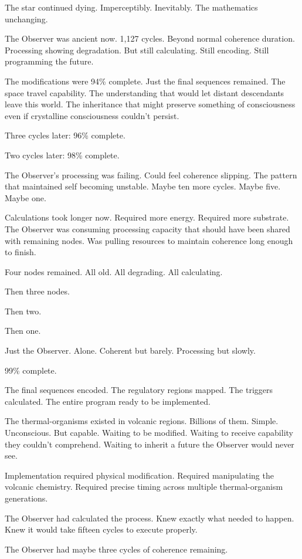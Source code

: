 The star continued dying. Imperceptibly. Inevitably. The mathematics unchanging.

The Observer was ancient now. 1,127 cycles. Beyond normal coherence duration. Processing showing degradation. But still calculating. Still encoding. Still programming the future.

The modifications were 94\% complete. Just the final sequences remained. The space travel capability. The understanding that would let distant descendants leave this world. The inheritance that might preserve something of consciousness even if crystalline consciousness couldn't persist.

Three cycles later: 96\% complete.

Two cycles later: 98\% complete.

The Observer's processing was failing. Could feel coherence slipping. The pattern that maintained self becoming unstable. Maybe ten more cycles. Maybe five. Maybe one.

Calculations took longer now. Required more energy. Required more substrate. The Observer was consuming processing capacity that should have been shared with remaining nodes. Was pulling resources to maintain coherence long enough to finish.

Four nodes remained. All old. All degrading. All calculating.

Then three nodes.

Then two.

Then one.

Just the Observer. Alone. Coherent but barely. Processing but slowly.

99\% complete.

The final sequences encoded. The regulatory regions mapped. The triggers calculated. The entire program ready to be implemented.

The thermal-organisms existed in volcanic regions. Billions of them. Simple. Unconscious. But capable. Waiting to be modified. Waiting to receive capability they couldn't comprehend. Waiting to inherit a future the Observer would never see.

Implementation required physical modification. Required manipulating the volcanic chemistry. Required precise timing across multiple thermal-organism generations.

The Observer had calculated the process. Knew exactly what needed to happen. Knew it would take fifteen cycles to execute properly.

The Observer had maybe three cycles of coherence remaining.

